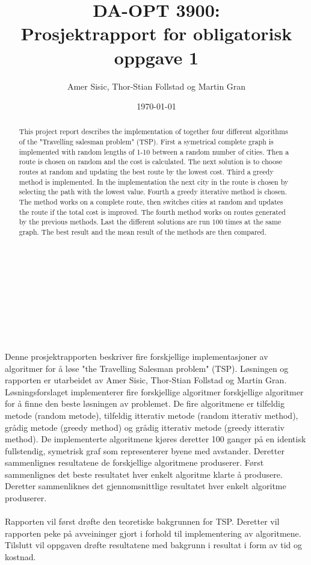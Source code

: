 \documentclass[12pt]{article}
\title{DA-OPT 3900:\\Prosjektrapport for obligatorisk oppgave 1}
\author{Amer Sisic, Thor-Stian Follstad og Martin Gran}
\date{\today}
\begin{document}
\setcounter{section}{1}

\maketitle
\thispagestyle{myheadings}
\linespread{1.00}
\vspace{\fill}
\begin{abstract}
		This project report describes the implementation of together four different algorithms of the "Travelling salesman problem" (TSP).
		First a symetrical complete graph is implemented with random lengths of 1-10 between a random number of cities. Then a route is 
		chosen on random and the cost is calculated. The next solution is to choose routes at random and updating the best route by the 
		lowest cost. Third a greedy method is implemented. In the implementation the next city in the route is chosen by selecting
		the path with the lowest value. Fourth a greedy itterative method is chosen. The method works on a complete route, then switches
		cities at random and updates the route if the total cost is improved. The fourth method works on routes generated by the previous
		methods. Last the different solutions are run 100 times at the same graph. The best result and the mean result of the methods are then compared.
\\ \\ \\ \\ \\ \\ \\ \\ \\
\end{abstract}
\vspace{\fill}
\pagebreak


\thispagestyle{empty}%
\tableofcontents
\pagebreak

\indent
		Denne prosjektrapporten beskriver fire forskjellige implementasjoner av algoritmer for {\aa} l{\o}se "the Travelling Salesman problem" (TSP).
		L{\o}sningen og rapporten er utarbeidet av Amer Sisic, Thor-Stian Follstad og Martin Gran. L{\o}sningsforslaget implementerer fire forskjellige algoritmer
		forskjellige algoritmer for {\aa} finne den beste l{\o}sningen av problemet. De fire algoritmene er tilfeldig metode (random metode), tilfeldig itterativ metode (random itterativ method), gr{\aa}dig 
		metode (greedy method) og gr{\aa}dig itterativ metode (greedy itterativ method). De implementerte algoritmene kj{\o}res deretter 100 ganger p{\aa} en identisk
		fullstendig, symetrisk graf som representerer byene med avstander. Deretter sammenlignes resultatene de forskjellige algoritmene produserer. F{\o}rst sammenlignes
		det beste resultatet hver enkelt algoritme klarte {\aa} produsere. Deretter sammenliknes det gjennomsnittlige resultatet hver enkelt algoritme produserer. \\\\
		Rapporten vil f{\o}rst dr{\o}fte den teoretiske bakgrunnen for TSP. Deretter vil rapporten peke p{\aa} avveininger gjort i forhold til implementering av algoritmene.
		Tilslutt vil oppgaven dr{\o}fte resultatene med bakgrunn i resultat i form av tid og kostnad.
\end{document}
